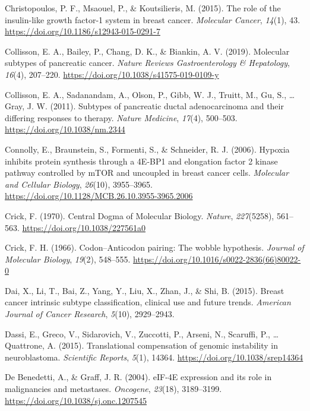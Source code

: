 \documentclass[12pt,openany]{book}
\begin{document}
\hypertarget{ref-Christopoulos2015}{}
Christopoulos, P. F., Msaouel, P., \& Koutsilieris, M. (2015). The role
of the insulin-like growth factor-1 system in breast cancer.
\emph{Molecular Cancer}, \emph{14}(1), 43.
\url{https://doi.org/10.1186/s12943-015-0291-7}

\hypertarget{ref-Collisson2019}{}
Collisson, E. A., Bailey, P., Chang, D. K., \& Biankin, A. V. (2019).
Molecular subtypes of pancreatic cancer. \emph{Nature Reviews
Gastroenterology \& Hepatology}, \emph{16}(4), 207--220.
\url{https://doi.org/10.1038/s41575-019-0109-y}

\hypertarget{ref-Collisson2011}{}
Collisson, E. A., Sadanandam, A., Olson, P., Gibb, W. J., Truitt, M.,
Gu, S., \ldots{} Gray, J. W. (2011). Subtypes of pancreatic ductal
adenocarcinoma and their differing responses to therapy. \emph{Nature
Medicine}, \emph{17}(4), 500--503. \url{https://doi.org/10.1038/nm.2344}

\hypertarget{ref-Connolly2006}{}
Connolly, E., Braunstein, S., Formenti, S., \& Schneider, R. J. (2006).
Hypoxia inhibits protein synthesis through a 4E-BP1 and elongation
factor 2 kinase pathway controlled by mTOR and uncoupled in breast
cancer cells. \emph{Molecular and Cellular Biology}, \emph{26}(10),
3955--3965. \url{https://doi.org/10.1128/MCB.26.10.3955-3965.2006}

\hypertarget{ref-Crick1970}{}
Crick, F. (1970). Central Dogma of Molecular Biology. \emph{Nature},
\emph{227}(5258), 561--563. \url{https://doi.org/10.1038/227561a0}

\hypertarget{ref-Crick1966}{}
Crick, F. H. (1966). Codon--Anticodon pairing: The wobble hypothesis.
\emph{Journal of Molecular Biology}, \emph{19}(2), 548--555.
\url{https://doi.org/10.1016/s0022-2836(66)80022-0}

\hypertarget{ref-Dai2015}{}
Dai, X., Li, T., Bai, Z., Yang, Y., Liu, X., Zhan, J., \& Shi, B.
(2015). Breast cancer intrinsic subtype classification, clinical use and
future trends. \emph{American Journal of Cancer Research}, \emph{5}(10),
2929--2943.

\hypertarget{ref-Dassi2015}{}
Dassi, E., Greco, V., Sidarovich, V., Zuccotti, P., Arseni, N.,
Scaruffi, P., \ldots{} Quattrone, A. (2015). Translational compensation
of genomic instability in neuroblastoma. \emph{Scientific Reports},
\emph{5}(1), 14364. \url{https://doi.org/10.1038/srep14364}

\hypertarget{ref-DeBenedetti2004}{}
De Benedetti, A., \& Graff, J. R. (2004). eIF-4E expression and its role
in malignancies and metastases. \emph{Oncogene}, \emph{23}(18),
3189--3199. \url{https://doi.org/10.1038/sj.onc.1207545}
\end{document}
